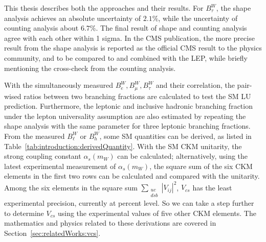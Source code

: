 This thesis describes both the approaches and their results. For $B^W_\tau$, the shape analysis achieves an absolute uncertainty of $2.1\%$, while the uncertainty of counting analysis about $6.7\%$. The final result of shape and counting analysis agree with each other within 1 sigma. In the CMS publication, the more precise result from the shape analysis is reported as the official CMS result to the physics community, and to be compared to and combined with the LEP, while briefly mentioning the cross-check from the counting analysis. 

With the simultaneously measured $B^W_e, B^W_\mu ,B^W_\tau$ and their correlation, the pair-wised ratios between two branching fractions are calculated to test the SM LU prediction. Furthermore, the leptonic and inclusive hadronic branching fraction under the lepton universality assumption are also estimated by repeating the shape analysis with the same parameter for three leptonic branching fractions. From the measured $B^W_\ell$ or $B^W_h$, some SM quantities can be derived, as listed in Table~\ref{tab:introduction:derivedQuantity}. With the SM CKM unitarity, the strong coupling constant $\alpha_s(m_W)$ can be calculated; alternatively, using the latest experimental measurement of $\alpha_s(m_W)$, the square sum of the six CKM elements in the first two rows can be calculated and compared with the unitarity. Among the six elements in the square sum $\sum_{\substack{uc\\dsb}} |V_{ij}|^2$, $V_{cs}$ has the least experimental precision, currently at percent level. So we can take a step further to determine $V_{cs}$ using the experimental values of five other CKM elements. The mathematics and physics related to these derivations are covered in Section~\ref{sec:relatedWorks:vcs}.









